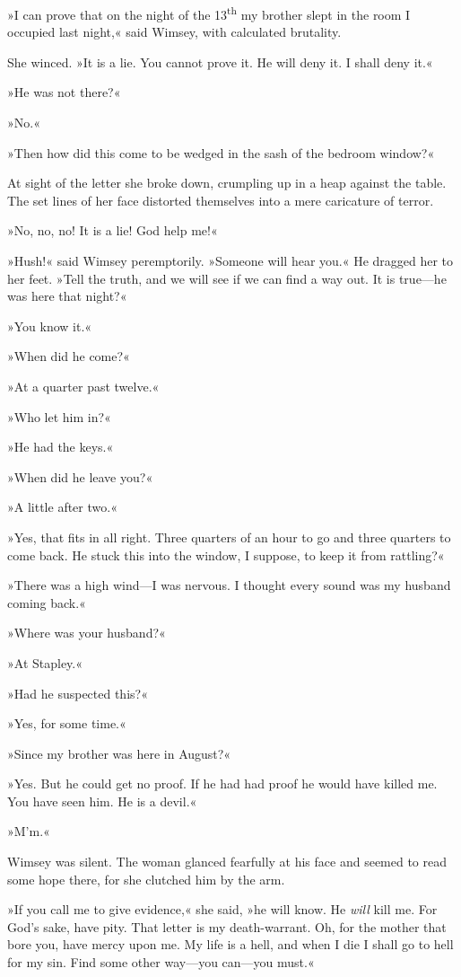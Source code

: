 »I can prove that on the night of the 13\textsuperscript{th} my brother slept in the room I occupied last night,« said Wimsey, with calculated brutality.

She winced. »It is a lie. You cannot prove it. He will deny it. I shall deny it.«

»He was not there?«

»No.«

»Then how did this come to be wedged in the sash of the bedroom window?«

At sight of the letter she broke down, crumpling up in a heap against the table. The set lines of her face distorted themselves into a mere caricature of terror.

»No, no, no! It is a lie! God help me!«

»Hush!« said Wimsey peremptorily. »Someone will hear you.« He dragged her to her feet. »Tell the truth, and we will see if we can find a way out. It is true—he was here that night?«

»You know it.«

»When did he come?«

»At a quarter past twelve.«

»Who let him in?«

»He had the keys.«

»When did he leave you?«

»A little after two.«

»Yes, that fits in all right. Three quarters of an hour to go and three quarters to come back. He stuck this into the window, I suppose, to keep it from rattling?«

»There was a high wind—I was nervous. I thought every sound was my husband coming back.«

»Where was your husband?«

»At Stapley.«

»Had he suspected this?«

»Yes, for some time.«

»Since my brother was here in August?«

»Yes. But he could get no proof. If he had had proof he would have killed me. You have seen him. He is a devil.«

»M'm.«

Wimsey was silent. The woman glanced fearfully at his face and seemed to read some hope there, for she clutched him by the arm.

»If you call me to give evidence,« she said, »he will know. He \textit{will} kill me. For God's sake, have pity. That letter is my death-warrant.  Oh, for the mother that bore you, have mercy upon me. My life is a hell, and when I die I shall go to hell for my sin. Find some other way—you can—you must.«

